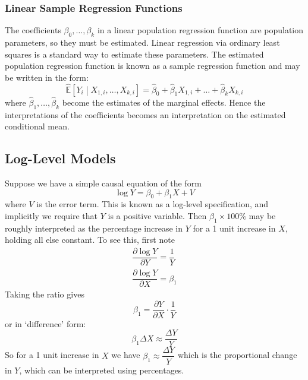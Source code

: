 \documentclass[11pt]{report} %
\begin{document}
\subsubsection{Linear Sample Regression Functions}

The coefficients $\beta_{0}, \dots, \beta_{k}$ in a linear population regression function are population parameters, so they must be estimated. Linear regression via ordinary least squares is a standard way to estimate these parameters. The estimated population regression function is known as a sample regression function and may be written in the form:
\begin{equation}
\widehat{\mathbb{E}}\left[Y_{i}\middle|X_{1, i}, \dots, X_{k, i}\right] = \widehat{\beta}_{0} + \widehat{\beta}_{1}X_{1, i} + \dots + \widehat{\beta}_{k}X_{k, i}
\end{equation}
where $\widehat{\beta}_{1}, \dots, \widehat{\beta}_{k}$ become the estimates of the marginal effects. Hence the interpretations of the coefficients becomes an interpretation   on the estimated conditional mean.

\subsection{Log-Level Models}

Suppose we have a simple causal equation of the form
\begin{equation}
\log Y = \beta_{0} + \beta_{1}X + V
\end{equation}
where $V$ is the error term. This is known as a log-level specification, and implicitly we require that $Y$ is a positive variable. Then $\beta_{1}\times 100\%$ may be roughly interpreted as the percentage increase in $Y$ for a 1 unit increase in $X$, holding all else constant. To see this, first note 
\begin{gather}
\dfrac{\partial \log Y}{\partial Y} = \dfrac{1}{Y} \\
\dfrac{\partial \log Y}{\partial X} = \beta_{1}
\end{gather}
Taking the ratio gives
\begin{equation}
\beta_{1} = \dfrac{\partial Y}{\partial X}\cdot\dfrac{1}{Y}
\end{equation}
or in `difference' form:
\begin{equation}
\beta_{1}\Delta X \approx \dfrac{\Delta Y}{Y}
\end{equation}
So for a 1 unit increase in $X$ we have $\beta_{1} \approx \dfrac{\Delta Y}{Y}$ which is the proportional change in $Y$, which can be interpreted using percentages.
\end{document}
